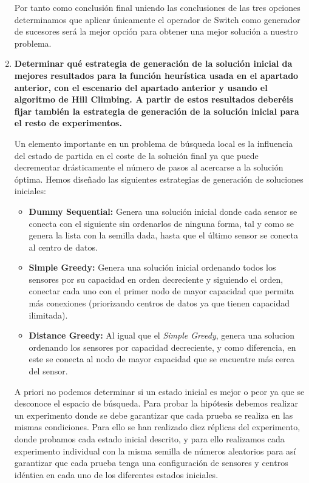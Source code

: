 \documentclass{article}
\begin{document}
\begin{enumerate}
  Por tanto como conclusión final uniendo las conclusiones de las tres opciones determinamos que aplicar únicamente el operador de Switch como generador de sucesores será la mejor opción para obtener una mejor solución a nuestro problema.

  \item \textbf{Determinar qué estrategia de generación de la solución inicial da mejores resultados para la función heurística usada en el apartado anterior, con el escenario del apartado anterior y usando el algoritmo de Hill Climbing. A partir de estos resultados deberéis fijar también la estrategia de generación de la solución inicial para el resto de experimentos.}

  Un elemento importante en un problema de búsqueda local es la influencia del estado de partida en el coste de la solución final ya que puede decrementar drásticamente el número de pasos al acercarse a la solución óptima. Hemos diseñado las siguientes estrategias de generación de soluciones iniciales:
  \begin{itemize}
    \item \textbf{Dummy Sequential:} Genera una solución inicial donde cada sensor se conecta con el siguiente sin ordenarlos de ninguna forma, tal y como se genera la lista con la semilla dada, hasta que el último sensor se conecta al centro de datos.
    \item \textbf{Simple Greedy:} Genera una solución inicial ordenando todos los sensores por su capacidad en orden decreciente y siguiendo el orden, conectar cada uno con el primer nodo de mayor capacidad que permita más conexiones (priorizando centros de datos ya que tienen capacidad ilimitada).
    \item \textbf{Distance Greedy:} Al igual que el \textit{Simple Greedy}, genera una solucion ordenando los sensores por capacidad decreciente, y como diferencia, en este se conecta al nodo de mayor capacidad que se encuentre más cerca del sensor.
  \end{itemize}

  A priori no podemos determinar si un estado inicial es mejor o peor ya que se desconoce el espacio de búsqueda. Para probar la hipótesis debemos realizar un experimento donde se debe garantizar que cada prueba se realiza en las mismas condiciones. Para ello se han realizado diez réplicas del experimento, donde probamos cada estado inicial descrito, y para ello realizamos cada experimento individual con la misma semilla de números aleatorios para así garantizar que cada prueba tenga una configuración de sensores y centros idéntica en cada uno de los diferentes estados iniciales.\par


\end{enumerate}
\end{document}
